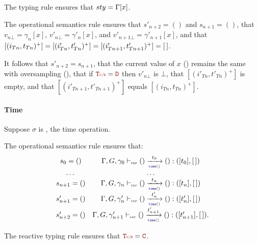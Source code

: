 \begin{skippableproof}
    The typing rule  ensures that $sty = \Gamma[x]$.

    The operational semantics rule  ensures that
    $s'_{n+2} = ()$ and $s_{n+1} = ()$, that $v_{n\bot} = \gamma_n[x]$, $v'_{n\bot} = \gamma'_n[x]$,
    and $v'_{n+1\bot} = \gamma'_{n+1}[x]$, and that $[(i_{Tn}, t_{Tn})^+] = [(i'_{Tn}, t'_{Tn})^+] =
        [(i'_{Tn+1}, t'_{Tn+1})^+] = [\,]$.

    It follows that $s'_{n+2} = s_{n+1}$, that the current value of $x$
    () remains the same with oversampling (), that if $\rType = \dType$ then $v'_{n\bot}$ is
    $\bot$, that $[(i'_{Tn}, t'_{Tn})^+]$ is empty, and that $[(i'_{Tn+1}, t'_{Tn+1})^+]$ equals
    $[(i_{Tn}, t_{Tn})^+]$.

    \paragraph{Time}
    Suppose $\sigma$ is \timeop, the time operation.

    The operational semantics rule  ensures that:
    \begin{equation*}
        \begin{array}{cc}
            s_0 = ()      & \sigmaOpSem{\gamma_0}{()}{\timeop}{t_0}{()}{t_0}{\,}                 \\
            \dots         & \dots                                                                \\
            s_{n+1} = ()  & \sigmaOpSem{\gamma_n}{()}{\timeop}{t_n}{()}{t_n}{\,}                 \\
            s'_{n+1} = () & \sigmaOpSem{\gamma'_n}{()}{\timeop}{t'_n}{()}{t'_n}{\,}              \\
            s'_{n+2} = () & \sigmaOpSem{\gamma'_{n+1}}{()}{\timeop}{t'_{n+1}}{()}{t'_{n+1}}{\,}.
        \end{array}
    \end{equation*}

    The reactive typing rule  ensures that
    $\rType = \cType$.


\end{skippableproof}
